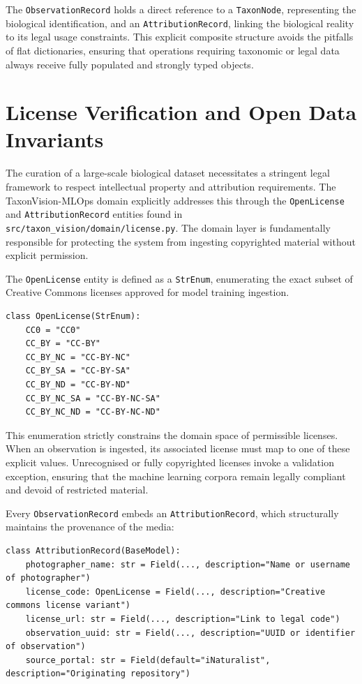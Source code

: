 The \texttt{ObservationRecord} holds a direct reference to a \texttt{TaxonNode}, representing the biological identification, and an \texttt{AttributionRecord}, linking the biological reality to its legal usage constraints. This explicit composite structure avoids the pitfalls of flat dictionaries, ensuring that operations requiring taxonomic or legal data always receive fully populated and strongly typed objects.

\section{License Verification and Open Data Invariants}
\label{sec:license_domain_invariants}

The curation of a large-scale biological dataset necessitates a stringent legal framework to respect intellectual property and attribution requirements. The TaxonVision-MLOps domain explicitly addresses this through the \texttt{OpenLicense} and \texttt{AttributionRecord} entities found in \texttt{src/taxon\_vision/domain/license.py}. The domain layer is fundamentally responsible for protecting the system from ingesting copyrighted material without explicit permission.

The \texttt{OpenLicense} entity is defined as a \texttt{StrEnum}, enumerating the exact subset of Creative Commons licenses approved for model training ingestion.

\begin{verbatim}
class OpenLicense(StrEnum):
    CC0 = "CC0"
    CC_BY = "CC-BY"
    CC_BY_NC = "CC-BY-NC"
    CC_BY_SA = "CC-BY-SA"
    CC_BY_ND = "CC-BY-ND"
    CC_BY_NC_SA = "CC-BY-NC-SA"
    CC_BY_NC_ND = "CC-BY-NC-ND"
\end{verbatim}

This enumeration strictly constrains the domain space of permissible licenses. When an observation is ingested, its associated license must map to one of these explicit values. Unrecognised or fully copyrighted licenses invoke a validation exception, ensuring that the machine learning corpora remain legally compliant and devoid of restricted material.

Every \texttt{ObservationRecord} embeds an \texttt{AttributionRecord}, which structurally maintains the provenance of the media:

\begin{verbatim}
class AttributionRecord(BaseModel):
    photographer_name: str = Field(..., description="Name or username of photographer")
    license_code: OpenLicense = Field(..., description="Creative commons license variant")
    license_url: str = Field(..., description="Link to legal code")
    observation_uuid: str = Field(..., description="UUID or identifier of observation")
    source_portal: str = Field(default="iNaturalist", description="Originating repository")
\end{verbatim}

